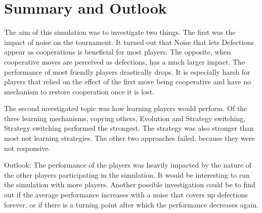 \section{Summary and Outlook}
The aim of this simulation was to investigate two things. The first was the impact of noise on the tournament. It turned out that Noise that lets Defections appear as cooperations is beneficial for most players. The opposite, when cooperative moves are perceived as defections, has a much larger impact. The performance of most friendly players drastically drops. It is especially harsh for players that relied on the effect of the first move being cooperative and have no mechanism to restore cooperation once it is lost.

The second investigated topic was how learning players would perform. Of the three learning mechanisms, copying others, Evolution and Strategy switching, Strategy switching performed the strongest. The strategy was also stronger than most not learning strategies. The other two approaches failed, because they were not responsive.

Outlook: The performance of the players was heavily impacted by the nature of the other players participating in the simulation. It would be interesting to run the simulation with more players. Another possible investigation could be to find out if the average performance increases with a noise that covers up defections forever, or if there is a turning point after which the performance decreases again.
